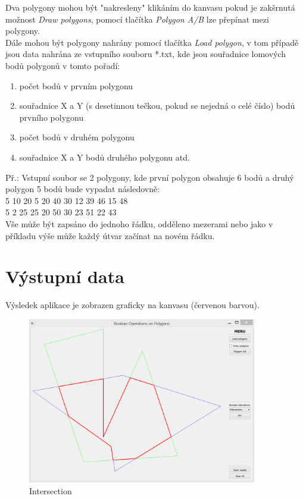 \documentclass[a4paper, 12pt]{article}
\begin{document}
Dva polygony mohou být "nakresleny" klikáním do kanvasu pokud je zakšrnutá možnost \textit{Draw polygons}, pomocí tlačítka \textit{Polygon A/B} lze přepínat mezi polygony.\\

\noindent Dále mohou být polygony nahrány pomocí tlačítka \textit{Load polygon}, v tom případě jsou data nahrána ze vstupního souboru *.txt, kde jsou souřadnice lomových bodů polygonů v tomto pořadí:
\begin{enumerate}
\item	počet bodů v prvním polygonu 
\item	 souřadnice X a Y (s desetinnou tečkou, pokud se nejedná o celé číslo) bodů prvního polygonu
\item	 počet bodů v druhém polygonu
\item souřadnice X a Y bodů druhého polygonu atd.
\end{enumerate}

Př.: Vstupní soubor se 2 polygony, kde první polygon obsahuje 6 bodů a druhý polygon 5 bodů bude vypadat následovně:\\
 
 5 10 20 5 20 40 30 12 39 46 15 48\\
5 2 25 25 20 50 30 23 51 22 43\\

Vše může být zapsáno do jednoho řádku, odděleno mezerami nebo jako v příkladu výše může každý útvar začínat na novém řádku.\\

\section{Výstupní data}
Výsledek aplikace je zobrazen graficky na kanvasu (červenou barvou).

\begin{figure}[h]
	\centering
	\includegraphics[width=10cm]{inter.jpg}
	\caption{Intersection}
\end{figure}
\clearpage
\end{document}
